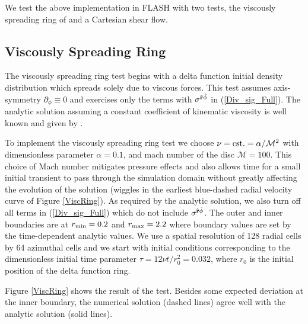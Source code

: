 We test the above implementation in FLASH with two tests, the viscously spreading ring of \cite{Pringle:1981} and a Cartesian shear flow. 

\subsection{Viscously Spreading Ring}
The viscously spreading ring test begins with a delta function initial density distribution which spreads solely due to viscous forces. This test assumes axis-symmetry $\partial_{\phi} \equiv 0$ and exercises only the terms with $\sigma^{\hat {\bf r} {\hat{\phi}}}$ in (\ref{Div_sig_Full}). The analytic solution assuming a constant coefficient of kinematic viscosity is well known and given by \cite{Pringle:1981}.

To implement the viscously spreading ring test we choose $\nu = \rm{cst.} =\alpha/\mathcal{M}^2$ with dimensionless parameter $\alpha = 0.1$, and mach number of the disc $\mathcal{M}=100$. This choice of Mach number mitigates pressure effects and also allows time for a small initial transient to pass through the simulation domain without greatly affecting the evolution of the solution (wiggles in the earliest blue-dashed radial velocity curve of Figure \ref{ViscRing}). As required by the analytic solution, we also turn off all terms in (\ref{Div_sig_Full}) which do not include $\sigma^{\hat {\bf r} {\hat{\phi}}}$. The outer and inner boundaries are at $r_{\rm{min}}=0.2$ and $r_{\rm{max}}=2.2$ where boundary values are set by the time-dependent analytic values. We use a spatial resolution of 128 radial cells by 64 azimuthal cells and we start with initial conditions corresponding to the dimensionless initial time parameter $\tau = 12 \nu t /r^2_0 = 0.032$, where $r_0$ is the initial position of the delta function ring.

Figure \ref{ViscRing} shows the result of the test. Besides some expected deviation at the inner boundary, the numerical solution (dashed lines) agree well with the analytic solution (solid lines).

